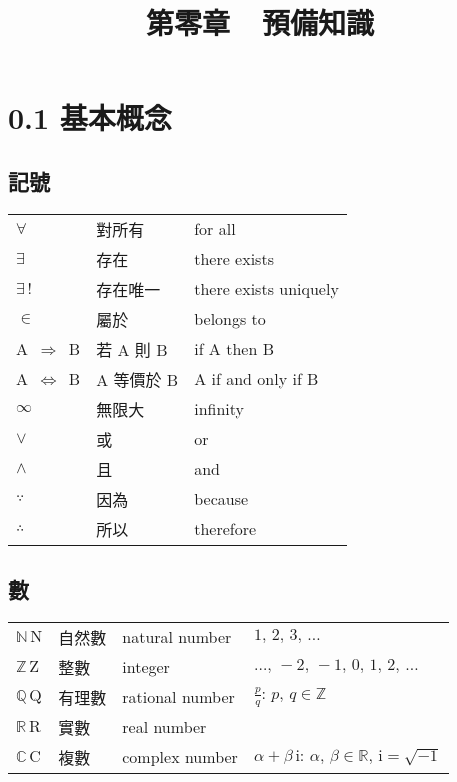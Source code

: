 \documentclass[12pt]{extarticle}
\newcommand{\ds}{\displaystyle}
\newcommand{\mi}{\mathrm{i}}
\theoremstyle{definition}
\begin{document}
\title{\texorpdfstring{\vspace{-2em} 第零章\ \ 預備知識}{第零章\ \ 預備知識}} 
\author{\vspace{-5em}}
\date{\vspace{-5em}}
\maketitle
\thispagestyle{firststyle}

\section*{0.1 基本概念}
\subsection*{記號}

\begin{table}[!htbp]
  \centering
  \begin{tabular}{lll}
    \toprule
    $\forall$ & 對所有 & for all \\
    $\exists$ & 存在   & there exists \\
    $\exists\,!$ & 存在唯一 & there exists uniquely \\
    $\in$ & 屬於 & belongs to \\
    A $\,\Longrightarrow\,$ B &  若 A 則 B & if A then B \\
    A $\,\Longleftrightarrow\,$ B &  A 等價於 B & A if and only if B \\
    $\infty$ & 無限大 & infinity \\
    $\vee$ & 或 & or \\
    $\wedge$ & 且 & and \\
    $\because$ & 因為 & because \\
    $\therefore$ & 所以 & therefore \\
    \bottomrule
  \end{tabular}
\end{table}

\subsection*{數}

\begin{table}[!htbp]
  \centering
  \begin{tabular}{llll}
    \toprule
    $\mathbb{N}\,\text{N}$ & 自然數 & natural number & $1,\,2,\,3,\,\ldots$ \\
    $\mathbb{Z}\,\text{Z}$ & 整數   & integer & $\ldots,\,-2,\,-1,\,0,\,1,\,2,\,\ldots$\\
    $\mathbb{Q}\,\text{Q}$ & 有理數 & rational number & $\ds\frac{p}{q}: \,p,\,q\in\mathbb{Z}$ \\
    $\mathbb{R}\,\text{R}$ & 實數 & real number &  \\
    $\mathbb{C}\,\text{C}$ & 複數 & complex number & $\ds\alpha + \beta\,\mi: \,\alpha,\,\beta\in\mathbb{R},\,\mi = \sqrt{-1}$ \\
    \bottomrule
  \end{tabular}
\end{table}
\end{document}
